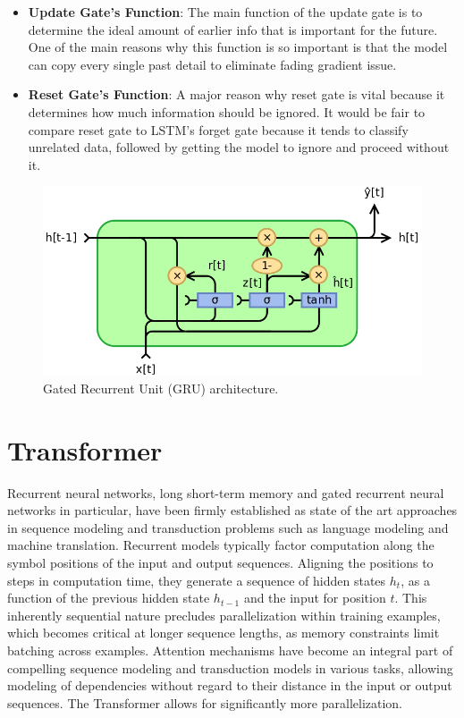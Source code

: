 \begin{itemize}
    \item \textbf{Update Gate’s Function}: The main function of the update gate is to determine the ideal amount of earlier info that is important for the future. One of the main reasons why this function is so important is that the model can copy every single past detail to eliminate fading gradient issue.
    \item \textbf{Reset Gate's Function}: A major reason why reset gate is vital because it determines how much information should be ignored. It would be fair to compare reset gate to LSTM’s forget gate because it tends to classify unrelated data, followed by getting the model to ignore and proceed without it.
\end{itemize}

\begin{figure}[H]
    \centering
    \includegraphics[width=.90\linewidth]{chapters/1_introduction/imgs/gru.png}
    \caption{Gated Recurrent Unit (GRU) architecture.}
    \label{fig:gruarch}
\end{figure}

\section{Transformer}

Recurrent neural networks, long short-term memory and gated recurrent neural networks
in particular, have been firmly established as state of the art approaches in sequence modeling and
transduction problems such as language modeling and machine translation.
Recurrent models typically factor computation along the symbol positions of the input and output
sequences. Aligning the positions to steps in computation time, they generate a sequence of hidden
states $h_t$, as a function of the previous hidden state $h_{t-1}$
and the input for position $t$. This inherently
sequential nature precludes parallelization within training examples, which becomes critical at longer
sequence lengths, as memory constraints limit batching across examples.
Attention mechanisms have become an integral part of compelling sequence modeling and transduction models in various tasks, allowing modeling of dependencies without regard to their distance in
the input or output sequences.
The Transformer allows for significantly more parallelization.

